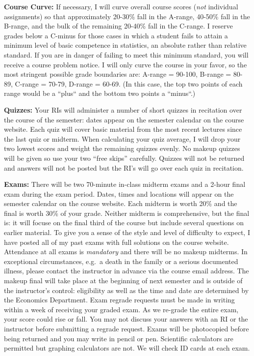 \documentclass[11pt, letterpaper]{article}
\begin{document}
\newpage

\noindent \textbf{Course Curve:}
If necessary, I will curve overall course scores (\emph{not} individual assignments) so that approximately 20-30\% fall in the A-range, 40-50\% fall in the B-range, and the bulk of the remaining 20-40\% fall in the C-range. 
I reserve grades below a C-minus for those cases in which a student fails to attain a minimum level of basic competence in statistics, an absolute rather than relative standard. 
If you are in danger of failing to meet this minimum standard, you will receive a course problem notice.
I will only curve the course in your favor, so the most stringent possible grade boundaries are: A-range = 90-100, B-range = 80-89, C-range = 70-79, D-range = 60-69.
(In this case, the top two points of each range would be a ``plus`` and the bottom two points a ``minus``.)

\medskip


\noindent \textbf{Quizzes:} 
Your RIs will administer a number of short quizzes in recitation over the course of the semester: dates appear on the semester calendar on the course website.
Each quiz will cover basic material from the most recent lectures since the last quiz or midterm. 
When calculating your quiz average, I will drop your two lowest scores and weight the remaining quizzes evenly. 
No makeup quizzes will be given so use your two ``free skips'' carefully.
Quizzes will not be returned and answers will not be posted but the RI's will go over each quiz in recitation.

\medskip

\noindent \textbf{Exams:} 
There will be two 70-minute in-class midterm exams and a 2-hour final exam during the exam period.
Dates, times and locations will appear on the semester calendar on the course website.
Each midterm is worth 20\% and the final is worth 30\% of your grade.
Neither midterm is comprehensive, but the final is: it will focuse on the final third of the course but include several questions on earlier material.
To give you a sense of the style and level of difficulty to expect, I have posted all of my past exams with full solutions on the course website.
Attendance at all exams is \emph{mandatory} and there will be no makeup midterms.
In exceptional circumstances, e.g.\ a death in the family or a serious documented illness, please contact the instructor in advance via the course email address.
The makeup final will take place at the beginning of next semester and is outside of the instructor's control: eligibility as well as the time and date are determined by the Economics Department. 
Exam regrade requests must be made in writing within a week of receiving your graded exam. 
As we re-grade the entire exam, your score could rise or fall. 
You may not discuss your answers with an RI or the instructor before submitting a regrade request. 
Exams will be photocopied before being returned and you may write in pencil or pen. 
Scientific calculators are permitted but graphing calculators are not. 
We will check ID cards at each exam.
\end{document}
